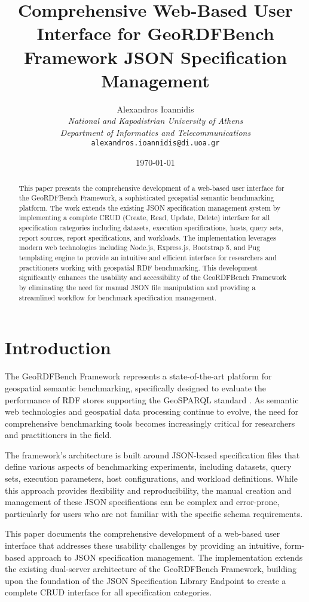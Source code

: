 \documentclass[11pt,a4paper]{article}
\title{Comprehensive Web-Based User Interface for GeoRDFBench Framework JSON Specification Management}
\author{
    Alexandros Ioannidis\\
    \textit{National and Kapodistrian University of Athens}\\
    \textit{Department of Informatics and Telecommunications}\\
    \texttt{alexandros.ioannidis@di.uoa.gr}
}
\date{\today}
\begin{document}
\maketitle

\begin{abstract}
This paper presents the comprehensive development of a web-based user interface for the GeoRDFBench Framework, a sophisticated geospatial semantic benchmarking platform. The work extends the existing JSON specification management system by implementing a complete CRUD (Create, Read, Update, Delete) interface for all specification categories including datasets, execution specifications, hosts, query sets, report sources, report specifications, and workloads. The implementation leverages modern web technologies including Node.js, Express.js, Bootstrap 5, and Pug templating engine to provide an intuitive and efficient interface for researchers and practitioners working with geospatial RDF benchmarking. This development significantly enhances the usability and accessibility of the GeoRDFBench Framework by eliminating the need for manual JSON file manipulation and providing a streamlined workflow for benchmark specification management.
\end{abstract}

\section{Introduction}

The GeoRDFBench Framework represents a state-of-the-art platform for geospatial semantic benchmarking, specifically designed to evaluate the performance of RDF stores supporting the GeoSPARQL standard \cite{geordfbench2024}. As semantic web technologies and geospatial data processing continue to evolve, the need for comprehensive benchmarking tools becomes increasingly critical for researchers and practitioners in the field.

The framework's architecture is built around JSON-based specification files that define various aspects of benchmarking experiments, including datasets, query sets, execution parameters, host configurations, and workload definitions. While this approach provides flexibility and reproducibility, the manual creation and management of these JSON specifications can be complex and error-prone, particularly for users who are not familiar with the specific schema requirements.

This paper documents the comprehensive development of a web-based user interface that addresses these usability challenges by providing an intuitive, form-based approach to JSON specification management. The implementation extends the existing dual-server architecture of the GeoRDFBench Framework, building upon the foundation of the JSON Specification Library Endpoint to create a complete CRUD interface for all specification categories.
\end{document}
